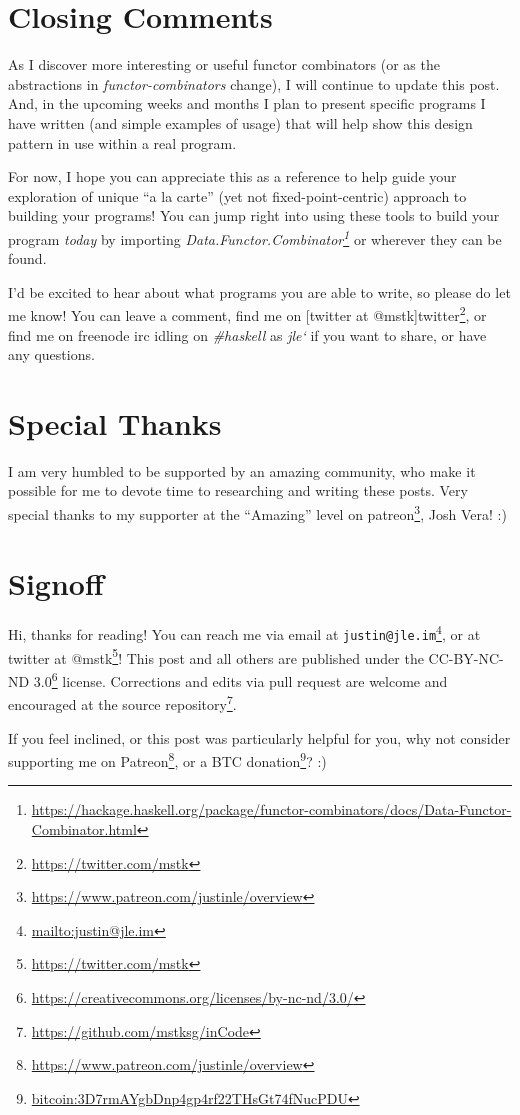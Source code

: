 \documentclass[]{article}
\renewcommand{\href}[2]{#2\footnote{\url{#1}}}
\begin{document}
\hypertarget{closing-comments}{%
\section{Closing Comments}\label{closing-comments}}

As I discover more interesting or useful functor combinators (or as the
abstractions in \emph{functor-combinators} change), I will continue to update
this post. And, in the upcoming weeks and months I plan to present specific
programs I have written (and simple examples of usage) that will help show this
design pattern in use within a real program.

For now, I hope you can appreciate this as a reference to help guide your
exploration of unique ``a la carte'' (yet not fixed-point-centric) approach to
building your programs! You can jump right into using these tools to build your
program \emph{today} by importing
\emph{\href{https://hackage.haskell.org/package/functor-combinators/docs/Data-Functor-Combinator.html}{Data.Functor.Combinator}}
or wherever they can be found.

I'd be excited to hear about what programs you are able to write, so please do
let me know! You can leave a comment, find me on {[}twitter at
@mstk{]}\href{https://twitter.com/mstk}{twitter}, or find me on freenode irc
idling on \emph{\#haskell} as \emph{jle`} if you want to share, or have any
questions.

\hypertarget{special-thanks}{%
\section{Special Thanks}\label{special-thanks}}

I am very humbled to be supported by an amazing community, who make it possible
for me to devote time to researching and writing these posts. Very special
thanks to my supporter at the ``Amazing'' level on
\href{https://www.patreon.com/justinle/overview}{patreon}, Josh Vera! :)

\hypertarget{signoff}{%
\section{Signoff}\label{signoff}}

Hi, thanks for reading! You can reach me via email at
\href{mailto:justin@jle.im}{\nolinkurl{justin@jle.im}}, or at twitter at
\href{https://twitter.com/mstk}{@mstk}! This post and all others are published
under the \href{https://creativecommons.org/licenses/by-nc-nd/3.0/}{CC-BY-NC-ND
3.0} license. Corrections and edits via pull request are welcome and encouraged
at \href{https://github.com/mstksg/inCode}{the source repository}.

If you feel inclined, or this post was particularly helpful for you, why not
consider \href{https://www.patreon.com/justinle/overview}{supporting me on
Patreon}, or a \href{bitcoin:3D7rmAYgbDnp4gp4rf22THsGt74fNucPDU}{BTC donation}?
:)
\end{document}
